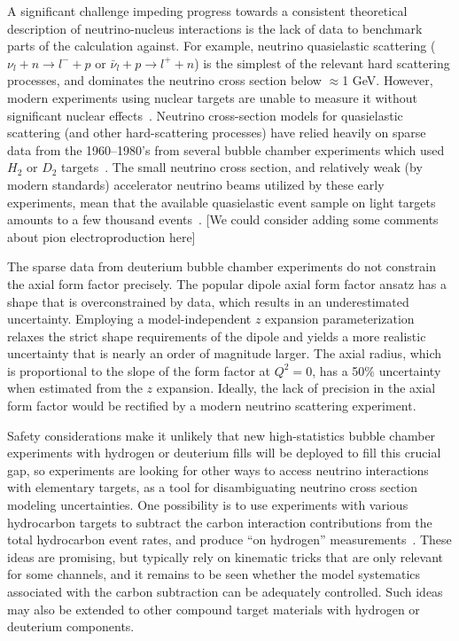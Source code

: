 A significant challenge impeding progress towards a consistent theoretical description of neutrino-nucleus interactions is the lack of data to benchmark parts of the calculation against. For example, neutrino quasielastic scattering ($\nu_{l} + n \rightarrow l^{-} + p$ or $\bar{\nu}_{l} + p \rightarrow l^{+} + n$) is the simplest of the relevant hard scattering processes, and dominates the neutrino cross section below $\approx$1 GeV. However, modern experiments using nuclear targets are unable to measure it without significant nuclear effects~\cite{garvey_review_2014, NuSTEC:2017hzk}.
Neutrino cross-section models for quasielastic scattering (and other hard-scattering processes) have relied heavily on sparse data from the 1960--1980's from several bubble chamber experiments which used $H_{2}$ or $D_2$ targets~\cite{zeller12, ParticleDataGroup:2020ssz}.
The small neutrino cross section, and relatively weak (by modern standards) accelerator neutrino beams utilized by these early experiments, mean that the available quasielastic event sample on light targets amounts to a few thousand events~\cite{ANL_Barish_1977, BNL_Baker_1981}.
{\color{red} [We could consider adding some comments about pion electroproduction here]}

The sparse data from deuterium bubble chamber experiments do not constrain
 the axial form factor precisely.
The popular dipole axial form factor ansatz has a shape that
 is overconstrained by data, which results in an underestimated uncertainty.
Employing a model-independent $z$ expansion parameterization
 relaxes the strict shape requirements of the dipole and yields
 a more realistic uncertainty that is nearly an order of magnitude larger.
The axial radius, which is proportional to the slope of the form factor at $Q^2=0$,
 has a 50\% uncertainty when estimated from the $z$ expansion.
Ideally, the lack of precision in the axial form factor would
 be rectified by a modern neutrino scattering experiment.

Safety considerations make it unlikely that new high-statistics bubble chamber experiments with
 hydrogen or deuterium fills will be deployed to fill this crucial gap,
 so experiments are looking for other ways to access neutrino interactions
 with elementary targets, as a tool for disambiguating neutrino cross section modeling uncertainties.
One possibility is to use experiments with various hydrocarbon targets to subtract the carbon interaction contributions from
 the total hydrocarbon event rates, and produce ``on hydrogen'' measurements~\cite{PhysRevD.92.051302, PhysRevD.101.092003, Hamacher-Baumann:2020ogq, DUNE:2021tad}.
 These ideas are promising, but typically rely on kinematic tricks that are only relevant for some channels, and it remains to be seen whether the model systematics associated with the carbon subtraction can be adequately controlled. Such ideas may also be extended to other compound target materials with hydrogen or deuterium components.

